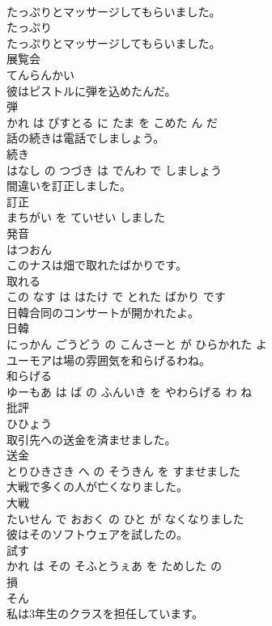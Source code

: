 \documentclass[8pt]{extreport}
\begin{document}
\begin{CJK}{UTF8}{min}
\\	たっぷりとマッサージしてもらいました。	
\\	たっぷり 
\\	たっぷりとマッサージしてもらいました。			
\\	展覧会	
\\	てんらんかい			
\\	彼はピストルに弾を込めたんだ。	
\\	弾 
\\	かれ は ぴすとる に たま を こめた ん だ			
\\	話の続きは電話でしましょう。	
\\	続き 
\\	はなし の つづき は でんわ で しましょう			
\\	間違いを訂正しました。	
\\	訂正 
\\	まちがい を ていせい しました			
\\	発音	
\\	はつおん			
\\	このナスは畑で取れたばかりです。	
\\	取れる 
\\	この なす は はたけ で とれた ばかり です			
\\	日韓合同のコンサートが開かれたよ。	
\\	日韓 
\\	にっかん ごうどう の こんさーと が ひらかれた よ			
\\	ユーモアは場の雰囲気を和らげるわね。	
\\	和らげる 
\\	ゆーもあ は ば の ふんいき を やわらげる わ ね			
\\	批評	
\\	ひひょう			
\\	取引先への送金を済ませました。	
\\	送金 
\\	とりひきさき へ の そうきん を すませました			
\\	大戦で多くの人が亡くなりました。	
\\	大戦 
\\	たいせん で おおく の ひと が なくなりました			
\\	彼はそのソフトウェアを試したの。	
\\	試す 
\\	かれ は その そふとうぇあ を ためした の			
\\	損	
\\	そん			
\\	私は3年生のクラスを担任しています。	

\end{CJK}
\end{document}
